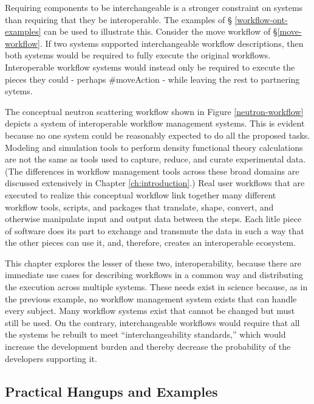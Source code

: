 Requiring components to be interchangeable is a stronger constraint on systems
than requiring that they be interoperable. The examples of \S
\ref{workflow-ont-examples} can be used to illustrate this. Consider the move
workflow of \S \ref{move-workflow}. If two systems supported interchangeable
workflow descriptions, then both systems would be required to fully execute the
original workflows. Interoperable workflow systems would instead only be
required to execute the pieces they could - perhaps \#moveAction - while leaving
the rest to partnering sytems.

The conceptual neutron scattering workflow shown in Figure
\ref{neutron-workflow} depicts a system of interoperable workflow management
systems. This is evident because no one system could be reasonably expected to
do all the proposed tasks. Modeling and simulation tools to perform density
functional theory calculations are not the same as tools used to capture,
reduce, and curate experimental data. (The differences in workflow management tools
across these broad domains are discussed extensively in Chapter
\ref{ch:introduction}.) Real user workflows that are executed to realize this
conceptual workflow link together many different workflow tools, scripts, and
packages that translate, shape, convert, and otherwise manipulate input and
output data between the steps. Each litle piece of software does its part to
exchange and transmute the data in such a way that the other pieces can use it,
and, therefore, creates an interoperable ecosystem.

This chapter explores the lesser of these two, interoperability, because there
are immediate use cases for describing workflows in a common way and
distributing the execution across multiple systems. These needs exist in
science because, as in the previous example, no workflow management system
exists that can handle every subject. Many workflow systems exist that cannot be
changed but must still be used. On the contrary, interchangeable workflows
would require that all the systems be rebuilt to meet ``interchangeability
standards,'' which would increase the development burden and thereby decrease
the probability of the developers supporting it.

\subsection{Practical Hangups and Examples}
\label{practicality}


